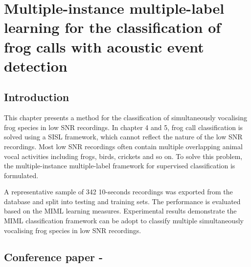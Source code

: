 
\chapter[Multiple-instance multiple-label learning for the classification of frog calls with acoustic event detection]{Multiple-instance multiple-label learning for the classification of frog calls with acoustic event detection}
\label{cha:cha6MIML}


\section{Introduction}
\label{sec:intro}

This chapter presents a method for the classification of simultaneously vocalising frog species in low SNR recordings. In chapter 4 and 5, frog call classification is solved using a SISL framework, which cannot reflect the nature of the low SNR recordings. Most low SNR recordings often 
contain multiple overlapping animal vocal activities including frogs, birds, crickets and so on. To solve this problem, the multiple-instance multiple-label framework for supervised classification is formulated.

A representative sample of 342 10-seconds recordings was exported from the database and split into testing and training sets. The performance is evaluated based on the MIML learning measures. Experimental results demonstrate the MIML classification framework can be adopt to classify multiple simultaneously vocalising frog species in low SNR recordings.


\section{Conference paper - }



